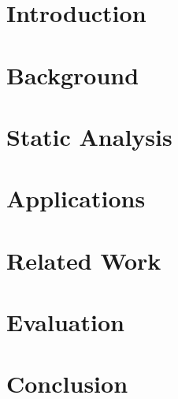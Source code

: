 \documentclass[12pt,a4paper]{report}
\begin{document}



\blankpage



\afterpage{\blankpage}



\afterpage{\blankpage}

\tableofcontents
\listoffigures

\clearpage


\chapter{Introduction}



\chapter{Background}



\chapter{Static Analysis}



\chapter{Applications}



\chapter{Related Work}



\chapter{Evaluation}



\chapter{Conclusion}



\printbibliography
\end{document}
